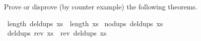 \begin{isabellebody}
\begin{isamarkuptext}
Prove or disprove (by counter example) the following theorems.%
\end{isamarkuptext}%
\isamarkuptrue%
\ {\isachardoublequote}length\ {\isacharparenleft}deldups\ xs{\isacharparenright}\ {\isacharless}{\isacharequal}\ length\ xs{\isachardoublequote}\isamarkupfalse%
\isanewline
\isamarkupfalse%
\ {\isachardoublequote}nodups\ {\isacharparenleft}deldups\ xs{\isacharparenright}{\isachardoublequote}\isamarkupfalse%
\isanewline
\isamarkupfalse%
\ {\isachardoublequote}deldups\ {\isacharparenleft}rev\ xs{\isacharparenright}\ {\isacharequal}\ rev\ {\isacharparenleft}deldups\ xs{\isacharparenright}{\isachardoublequote}\isamarkupfalse%
\isamarkupfalse%
\isamarkupfalse%
\end{isabellebody}%
